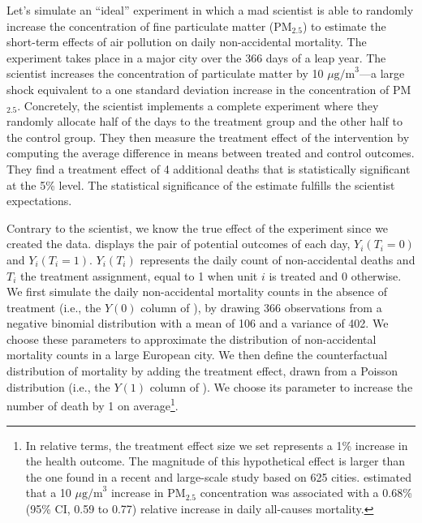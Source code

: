\documentclass[12pt]{article}
\begin{document}
    Let's simulate an ``ideal'' experiment in which a mad scientist is able to randomly increase the concentration of fine particulate matter (PM$_{2.5}$) to estimate the short-term effects of air pollution on daily non-accidental mortality. The experiment takes place in a major city over the 366 days of a leap year. The scientist increases the concentration of particulate matter by 10 $\mu \text{g/m}^3$---a large shock equivalent to a one standard deviation increase in the concentration of PM$_{2.5}$. Concretely, the scientist implements a complete experiment where they randomly allocate half of the days to the treatment group and the other half to the control group. They then measure the treatment effect of the intervention by computing the average difference in means between treated and control outcomes. They find a treatment effect of 4 additional deaths that is statistically significant at the 5\% level. The statistical significance of the estimate fulfills the scientist expectations.

    Contrary to the scientist, we know the true effect of the experiment since we created the data.  displays the pair of potential outcomes of each day, $Y_{i}(T_{i}=0)$ and $Y_{i}(T_{i}=1)$. $Y_{i}(T_{i})$ represents the daily count of non-accidental deaths and $T_{i}$ the treatment assignment, equal to 1 when unit $i$ is treated and 0 otherwise. We first simulate the daily non-accidental mortality counts in the absence of treatment (i.e., the $Y(0)$ column of ), by drawing 366 observations from a negative binomial distribution with a mean of 106 and a variance of 402. We choose these parameters to approximate the distribution of non-accidental mortality counts in a large European city. We then define the counterfactual distribution of mortality by adding the treatment effect, drawn from a Poisson distribution (i.e., the $Y(1)$ column of ). We choose its parameter to increase the number of death by 1 on average\footnote{In relative terms, the treatment effect size we set represents a 1\% increase in the health outcome. The magnitude of this hypothetical effect is larger than the one found in a recent and large-scale study based on 625 cities. \cite{liu_ambient_2019} estimated that a 10 $\mu \text{g/m}^3$ increase in $\text{PM}_{2.5}$ concentration was associated with a 0.68\% (95\% CI, 0.59 to 0.77) relative increase in daily all-causes mortality.}.

    
\end{document}
